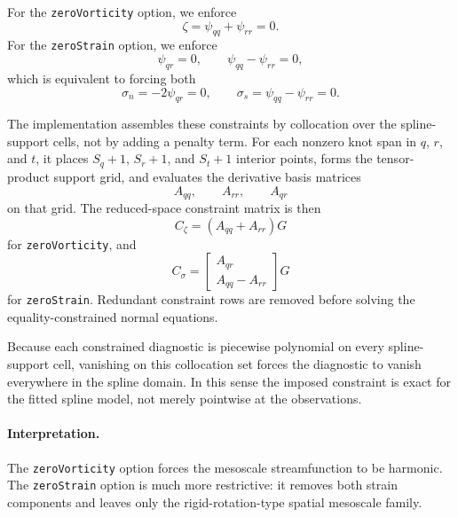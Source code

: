 \documentclass{article}
\begin{document}
For the \texttt{zeroVorticity} option, we enforce
\begin{equation}
\zeta = \psi_{qq} + \psi_{rr} = 0.
\end{equation}
For the \texttt{zeroStrain} option, we enforce
\begin{equation}
\psi_{qr} = 0,
\qquad
\psi_{qq} - \psi_{rr} = 0,
\end{equation}
which is equivalent to forcing both
\begin{equation}
\sigma_n = -2\psi_{qr} = 0,
\qquad
\sigma_s = \psi_{qq} - \psi_{rr} = 0.
\end{equation}

The implementation assembles these constraints by collocation over the
spline-support cells, not by adding a penalty term. For each nonzero knot span
in $q$, $r$, and $t$, it places $S_q+1$, $S_r+1$, and $S_t+1$ interior points,
forms the tensor-product support grid, and evaluates the derivative basis
matrices
\begin{equation}
A_{qq}, \qquad A_{rr}, \qquad A_{qr}
\end{equation}
on that grid. The reduced-space constraint matrix is then
\begin{equation}
C_{\zeta} = (A_{qq} + A_{rr})G
\end{equation}
for \texttt{zeroVorticity}, and
\begin{equation}
C_{\sigma}
=
\begin{bmatrix}
A_{qr}\\
A_{qq} - A_{rr}
\end{bmatrix}
G
\end{equation}
for \texttt{zeroStrain}. Redundant constraint rows are removed before solving
the equality-constrained normal equations.

Because each constrained diagnostic is piecewise polynomial on every
spline-support cell, vanishing on this collocation set forces the diagnostic to
vanish everywhere in the spline domain. In this sense the imposed constraint is
exact for the fitted spline model, not merely pointwise at the observations.

\paragraph{Interpretation.}
The \texttt{zeroVorticity} option forces the mesoscale streamfunction to be
harmonic. The \texttt{zeroStrain} option is much more restrictive: it removes
both strain components and leaves only the rigid-rotation-type spatial
mesoscale family.
\end{document}
